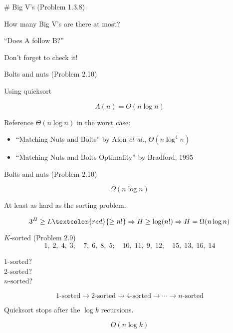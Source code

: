 \begin{frame}{\# Big V's (Problem 1.3.8)}
  \centerline{How many Big V's are there at most?}

  \pause
  \vspace{0.50cm}
  \centerline{``Does A follow B?''}

  \pause
  \vspace{0.50cm}
  \centerline{Don't forget to check it!}
\end{frame}
\begin{frame}{Bolts and nuts (Problem 2.10)}

  \pause
  \centerline{Using quicksort}

  \pause
  \[
	A(n) = O(n \log n)
  \]

  \pause
  \begin{alertblock}{Reference}
	$\Theta(n \log n)$ in the worst case:
	\begin{itemize}
	  \item ``Matching Nuts and Bolts'' by Alon \emph{et al.}, $\Theta(n \log^4 n)$
	  \item ``Matching Nuts and Bolts Optimality'' by Bradford, 1995
	\end{itemize}
  \end{alertblock}

\end{frame}
\begin{frame}{Bolts and nuts (Problem 2.10)}

  \[
	\Omega(n \log n)
  \]

  \pause
  \centerline{At least as hard as the sorting problem.}

  \pause
  \[
	3^{H} \ge L \textcolor{red}{\ge n!} \Rightarrow H \ge \log (n!) \Rightarrow H = \Omega(n \log n)
  \]
\end{frame}
\begin{frame}{$K$-sorted (Problem 2.9)}
  \[
	1,\;2,\;4,\;3;\quad 7,\;6,\;8,\;5;\quad 10,\;11,\;9,\;12;\quad 15,\;13,\;16,\;14
  \]

  \pause
  \vspace{0.20cm}

  \begin{center}
	$1\text{-sorted}$? \\ \pause
	$2\text{-sorted}$? \\ \pause
	$n\text{-sorted}$?
  \end{center}

  \pause
  \[
	1\text{-sorted} \to 2\text{-sorted} \to 4\text{-sorted} \to \cdots \to n\text{-sorted}
  \]

  \pause
  \centerline{Quicksort stops after the $\log k$ recursions.}

  \pause
  \[
	O(n \log k)
  \]
\end{frame}
